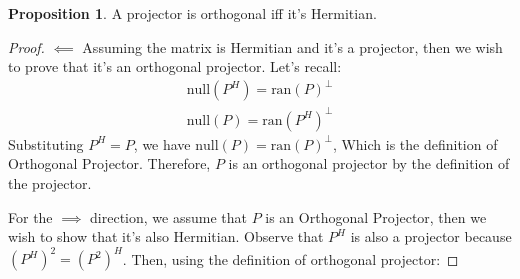 \documentclass[]{article}
\theoremstyle{definition}
\newtheorem{prop}{Proposition}
\begin{document}
            \begin{prop}
                A projector is orthogonal iff it's Hermitian. 
            \end{prop}
            \begin{proof}
                $\impliedby$ Assuming the matrix is Hermitian and it's a projector, then we wish to prove that it's an orthogonal projector. Let's recall: 
                \begin{align}
                    \text{null}(P^H) = \text{ran}(P)^{\perp}
                    \\
                    \text{null}(P) = \text{ran}(P^H)^{\perp}
                \end{align}
                Substituting $P^H = P$, we have $\text{null}(P) = \text{ran}(P)^{\perp}$, Which is the definition of Orthogonal Projector. Therefore, $P$ is an orthogonal projector by the definition of the projector. 
                \par
                For the $\implies$ direction, we assume that $P$ is an Orthogonal Projector, then we wish to show that it's also Hermitian. Observe that $P^H$ is also a projector because $(P^H)^2 = (P^2)^H$. Then, using the definition of orthogonal projector: 


            \end{proof}
            
            
\end{document}

